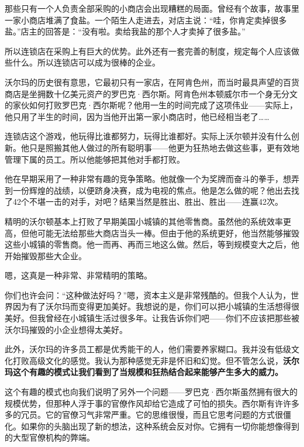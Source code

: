 那些只有一个人负责全部采购的小商店会出现糟糕的局面。曾经有个故事，故事里一家小商店堆满了食盐。一个陌生人走进去，对店主说：“哇，你肯定卖掉很多盐。”店主的回答是：“没有啦。卖给我盐的那个人才卖掉了很多盐。”
\par

所以连锁店在采购上有巨大的优势。此外还有一套完善的制度，规定每个人应该做些什么。所以连锁店可以成为很棒的企业。
\par

沃尔玛的历史很有意思，它最初只有一家店，在阿肯色州，而当时最具声望的百货商店是坐拥数十亿美元资产的罗巴克·西尔斯。阿肯色州本顿威尔市一个身无分文的家伙如何打败罗巴克·西尔斯呢？他用一生的时间完成了这项伟业——实际上，他只用了半生的时间，因为当他开出第一家小商店时，他已经相当老了……
\par

连锁店这个游戏，他玩得比谁都努力，玩得比谁都好。实际上沃尔顿并没有什么创新。他只是照搬其他人做过的所有聪明事——他更为狂热地去做这些事，更有效地管理下属的员工。所以他能够把其他对手都打败。
\par

他在早期采用了一种非常有趣的竞争策略。他就像一个为奖牌而奋斗的拳手，想弄到一份辉煌的战绩，以便跻身决赛，成为电视的焦点。他是怎么做的呢？他出去找了42个不堪一击的对手，对吧？结果当然是胜出、胜出、胜出——连赢42次。
\par

精明的沃尔顿基本上打败了早期美国小城镇的其他零售商。虽然他的系统效率更高，但他可能无法给那些大商店当头一棒。但由于他的系统更好，他当然能够摧毁这些小城镇的零售商。他一而再、再而三地这么做。然后，等到规模变大之后，他开始摧毁那些大企业。
\par

嗯，这真是一种非常、非常精明的策略。
\par

你们也许会问：“这种做法好吗？”嗯，资本主义是非常残酷的。但我个人认为，世界因为有了沃尔玛而变得更加美好。我想说的是，你们可以把小城镇的生活想得很美好。但我曾经在小城镇生活过很多年。让我告诉你们吧——你们不应该把那些被沃尔玛摧毁的小企业想得太美好。
\par

此外，沃尔玛的许多员工都是优秀能干的人，他们需要养家糊口。我并没有低级文化打败高级文化的感觉。我认为那种感觉无非是怀旧和幻觉。但不管怎么说，\textbf{沃尔玛这个有趣的模式让我们看到了当规模和狂热结合起来能够产生多大的威力。}
\par

这个有趣的模式也向我们说明了另外一个问题——罗巴克·西尔斯虽然拥有很大的规模优势，但那种人浮于事的官僚作风却给它造成了可怕的损失。西尔斯有许许多多的冗员。它的官僚习气非常严重。它的思维很慢，而且它思考问题的方式很僵化。如果你的头脑出现了新的想法，这种系统会反对你。它拥有一切你能想像得到的大型官僚机构的弊端。
\par

